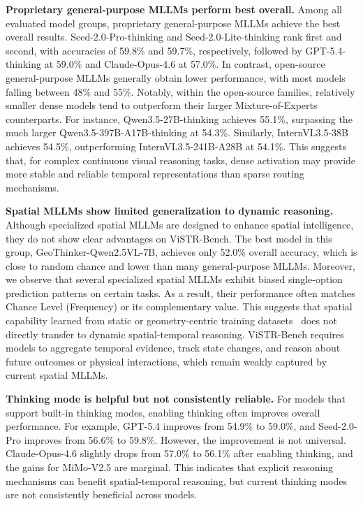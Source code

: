\textbf{Proprietary general-purpose MLLMs perform best overall.}
Among all evaluated model groups, proprietary general-purpose MLLMs achieve the best overall results.
Seed-2.0-Pro-thinking and Seed-2.0-Lite-thinking rank first and second, with accuracies of 59.8\% and 59.7\%, respectively, followed by GPT-5.4-thinking at 59.0\% and Claude-Opus-4.6 at 57.0\%.
In contrast, open-source general-purpose MLLMs generally obtain lower performance, with most models falling between 48\% and 55\%.
Notably, within the open-source families, relatively smaller dense models tend to outperform their larger Mixture-of-Experts counterparts.
For instance, Qwen3.5-27B-thinking achieves 55.1\%, surpassing the much larger Qwen3.5-397B-A17B-thinking at 54.3\%.
Similarly, InternVL3.5-38B achieves 54.5\%, outperforming InternVL3.5-241B-A28B at 54.1\%.
This suggests that, for complex continuous visual reasoning tasks, dense activation may provide more stable and reliable temporal representations than sparse routing mechanisms.

\textbf{Spatial MLLMs show limited generalization to dynamic reasoning.}
Although specialized spatial MLLMs are designed to enhance spatial intelligence, they do not show clear advantages on ViSTR-Bench.
The best model in this group, GeoThinker-Qwen2.5VL-7B, achieves only 52.0\% overall accuracy, which is close to random chance and lower than many general-purpose MLLMs.
Moreover, we observe that several specialized spatial MLLMs exhibit biased single-option prediction patterns on certain tasks.
As a result, their performance often matches Chance Level (Frequency) or its complementary value.
This suggests that spatial capability learned from static or geometry-centric training datasets~\citep{SPAR-Bench,LLaVA-Video} does not directly transfer to dynamic spatial-temporal reasoning.
ViSTR-Bench requires models to aggregate temporal evidence, track state changes, and reason about future outcomes or physical interactions, which remain weakly captured by current spatial MLLMs.

\textbf{Thinking mode is helpful but not consistently reliable.}
For models that support built-in thinking modes, enabling thinking often improves overall performance.
For example, GPT-5.4 improves from 54.9\% to 59.0\%, and Seed-2.0-Pro improves from 56.6\% to 59.8\%.
However, the improvement is not universal.
Claude-Opus-4.6 slightly drops from 57.0\% to 56.1\% after enabling thinking, and the gains for MiMo-V2.5 are marginal.
This indicates that explicit reasoning mechanisms can benefit spatial-temporal reasoning, but current thinking modes are not consistently beneficial across models.

